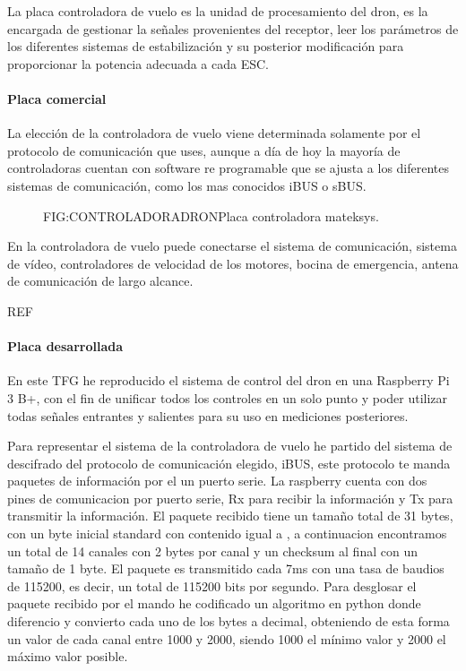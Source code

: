 
	La placa controladora de vuelo es la unidad de procesamiento del dron, es la encargada de gestionar la señales provenientes del receptor, leer los parámetros de los diferentes sistemas de estabilización y su posterior modificación para proporcionar la potencia adecuada a cada ESC.
\paragraph{Placa comercial}
	La elección de la controladora de vuelo viene determinada solamente por el protocolo de comunicación que uses, aunque a día de hoy la mayoría de controladoras cuentan con software re programable que se ajusta a los diferentes sistemas de comunicación, como los mas conocidos iBUS o sBUS.
	
	\begin{figure}{FIG:CONTROLADORADRON}{Placa controladora mateksys.}
\end{figure}

	En la controladora de vuelo puede conectarse el sistema de comunicación, sistema de vídeo, controladores de velocidad de los motores, bocina de emergencia, antena de comunicación de largo alcance.

REF %

\paragraph{Placa desarrollada}
	En este TFG he reproducido el sistema de control del dron en una Raspberry Pi 3 B+, con el fin de unificar todos los controles en un solo punto y poder utilizar todas señales entrantes y salientes para su uso en mediciones posteriores.
	
	Para representar el sistema de la controladora de vuelo he partido del sistema de descifrado del protocolo de comunicación elegido, iBUS, este protocolo te manda paquetes de información por el un puerto serie. La raspberry cuenta con dos pines de comunicacion por puerto serie, Rx para recibir la información y Tx para transmitir la información.
El paquete recibido tiene un tamaño total de 31 bytes, con un byte inicial standard con contenido igual a , a continuacion encontramos un total de 14 canales con 2 bytes por canal y un checksum al final con un tamaño de 1 byte. El paquete es transmitido cada 7ms con una tasa de baudios de 115200, es decir, un total de 115200 bits por segundo.
Para desglosar el paquete recibido por el mando he codificado un algoritmo en python donde diferencio y convierto cada uno de los bytes a decimal, obteniendo de esta forma un valor de cada canal entre 1000 y 2000, siendo 1000 el mínimo valor y 2000 el máximo valor posible.

